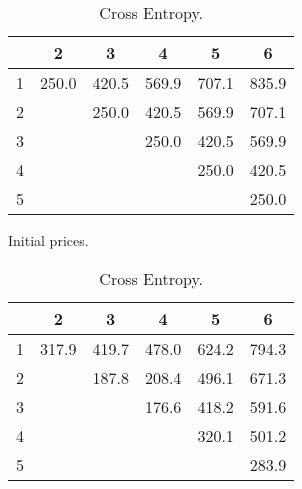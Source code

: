 \begin{table}[t]
	\centering
	
	\begin{subtable}[b]{0.49\textwidth}
    \centering
			\begin{tabular}{cccccc}
				\hline
					& 2 & 3 & 4 & 5 & 6 \\ 
				\hline
				1 & 250.0 & 420.5 & 569.9 & 707.1 & 835.9 \\ 
				2 &  & 250.0 & 420.5 & 569.9 & 707.1 \\ 
				3 &  &  & 250.0 & 420.5 & 569.9 \\ 
				4 &  &  &  & 250.0 & 420.5 \\ 
				5 &  &  &  &  & 250.0 \\ 
				 \hline
			\end{tabular}
    \caption{Initial prices.}
  \end{subtable}
	\hfill
	\begin{subtable}[b]{0.49\textwidth}
    \centering
			\begin{tabular}{cccccc}
				\hline
				 & 2 & 3 & 4 & 5 & 6 \\ 
				\hline
				1 & 317.9 & 419.7 & 478.0 & 624.2 & 794.3 \\ 
				2 &  & 187.8 & 208.4 & 496.1 & 671.3 \\ 
				3 &  &  & 176.6 & 418.2 & 591.6 \\ 
				4 &  &  &  & 320.1 & 501.2 \\ 
				5 &  &  &  &  & 283.9 \\ 
				 \hline
			\end{tabular}
    \caption{Cross Entropy.}
  \end{subtable}
	
	\\
	

\end{table}

